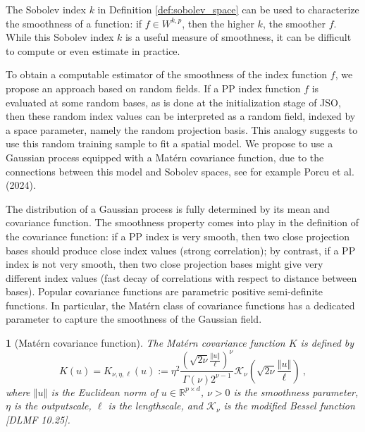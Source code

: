 \documentclass[
  12pt,
]{interact}
\theoremstyle{plain}
\newtheorem{defn}{\protect\definitionname}
\providecommand{\definitionname}{Definition}
\begin{document}
The Sobolev index \(k\) in Definition \ref{def:sobolev_space} can be
used to characterize the smoothness of a function: if \(f\in W^{k,p}\),
then the higher \(k\), the smoother \(f\). While this Sobolev index
\(k\) is a useful measure of smoothness, it can be difficult to compute
or even estimate in practice.

To obtain a computable estimator of the smoothness of the index function
\(f\), we propose an approach based on random fields. If a PP index
function \(f\) is evaluated at some random bases, as is done at the
initialization stage of JSO, then these random index values can be
interpreted as a random field, indexed by a space parameter, namely the
random projection basis. This analogy suggests to use this random
training sample to fit a spatial model. We propose to use a Gaussian
process equipped with a Matérn covariance function, due to the
connections between this model and Sobolev spaces, see for example Porcu
et al. (2024).

The distribution of a Gaussian process is fully determined by its mean
and covariance function. The smoothness property comes into play in the
definition of the covariance function: if a PP index is very smooth,
then two close projection bases should produce close index values
(strong correlation); by contrast, if a PP index is not very smooth,
then two close projection bases might give very different index values
(fast decay of correlations with respect to distance between bases).
Popular covariance functions are parametric positive semi-definite
functions. In particular, the Matérn class of covariance functions has a
dedicated parameter to capture the smoothness of the Gaussian field.

\begin{defn}[Matérn covariance function]\label{def:matern}
The Matérn covariance function $K$ is defined by
\begin{equation}
K(u)=K_{\nu,\eta,\ell}(u):=\eta^2\frac{\left(\sqrt{2\nu}\frac{\left\Vert u\right\Vert}{\ell}\right)^{\nu}}{\Gamma(\nu)2^{\nu-1}}\mathcal{K}_{\nu}\left(\sqrt{2\nu}\frac{\left\Vert u\right\Vert}{\ell}\right)\ ,\label{eq:matern}
\end{equation}
where $\left\Vert u\right\Vert$ is the Euclidean norm of $u\in\mathbb{R}^{p{\times}d}$, $\nu>0$ is the smoothness parameter, $\eta$ is the outputscale, $\ell$ is the lengthscale, and $\mathcal{K}_\nu$ is
the modified Bessel function [DLMF 10.25].
\end{defn}
\end{document}
